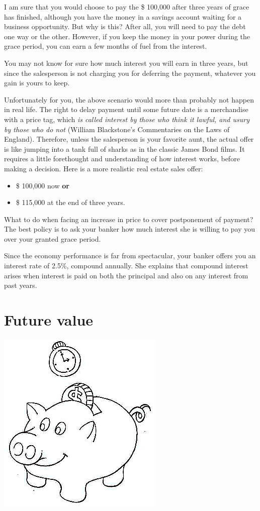 \documentclass[a4paper,12pt]{book}
\begin{document}
I am sure that you would choose to pay the \$ 100,000 after
three years of grace has finished, although you have the
money in a savings account waiting for a business
opportunity. But why is this? After all, you will need
to pay the debt one way or the other. However, if you
keep the money in your power during the grace period,
you can earn a few months of fuel from the interest.

You may not know for sure how much interest you
will earn in three years, but since the salesperson
is not charging you for deferring the payment,
whatever you gain is yours to keep.

Unfortunately for you, the above scenario would
more than probably not happen in real life.
The right to delay payment until some future
date is a merchandise with a price tag,
which {\em is called interest by those who
  think it lawful, and usury by those who
  do not} (William Blackstone's Commentaries
on the Laws of England). Therefore, unless
the salesperson is your favorite aunt,
the actual offer is like jumping into a tank
full of sharks as in the classic James Bond films.
It requires a little forethought and understanding
of how interest works, before making a decision.
Here is a more realistic real estate sales offer:

\begin{itemize}
\item \$ 100,000 now {\bf or}
\item \$ 115,000 at the end of three years.
\end{itemize}

What to do when facing an increase in price
to cover postponement of payment? The best
policy is to ask your banker how much interest
she is willing to pay you over your
granted grace period.

Since the economy performance is far
from spectacular, your banker offers you
an interest rate of 2.5\%, compound annually.
She explains that compound interest arises
when interest is paid on both the principal
and also on any interest from past years.

\section{Future value}

\includegraphics{figs-prefix/piggy.jpg}
\end{document}

